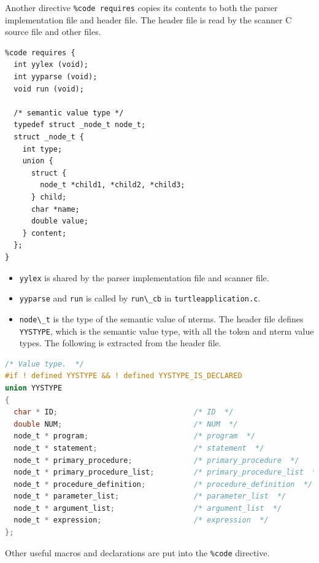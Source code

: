 Another directive \passthrough{\lstinline!\%code requires!} copies its
contents to both the parser implementation file and header file. The
header file is read by the scanner C source file and other files.

\begin{lstlisting}
%code requires {
  int yylex (void);
  int yyparse (void);
  void run (void);

  /* semantic value type */
  typedef struct _node_t node_t;
  struct _node_t {
    int type;
    union {
      struct {
        node_t *child1, *child2, *child3;
      } child;
      char *name;
      double value;
    } content;
  };
}
\end{lstlisting}

\begin{itemize}
\tightlist
\item
  \passthrough{\lstinline!yylex!} is shared by the parser implementation
  file and scanner file.
\item
  \passthrough{\lstinline!yyparse!} and \passthrough{\lstinline!run!} is
  called by \passthrough{\lstinline!run\_cb!} in
  \passthrough{\lstinline!turtleapplication.c!}.
\item
  \passthrough{\lstinline!node\_t!} is the type of the semantic value of
  nterms. The header file defines \passthrough{\lstinline!YYSTYPE!},
  which is the semantic value type, with all the token and nterm value
  types. The following is extracted from the header file.
\end{itemize}

\begin{lstlisting}[language=C]
/* Value type.  */
#if ! defined YYSTYPE && ! defined YYSTYPE_IS_DECLARED
union YYSTYPE
{
  char * ID;                               /* ID  */
  double NUM;                              /* NUM  */
  node_t * program;                        /* program  */
  node_t * statement;                      /* statement  */
  node_t * primary_procedure;              /* primary_procedure  */
  node_t * primary_procedure_list;         /* primary_procedure_list  */
  node_t * procedure_definition;           /* procedure_definition  */
  node_t * parameter_list;                 /* parameter_list  */
  node_t * argument_list;                  /* argument_list  */
  node_t * expression;                     /* expression  */
};
\end{lstlisting}

Other useful macros and declarations are put into the
\passthrough{\lstinline!\%code!} directive.


